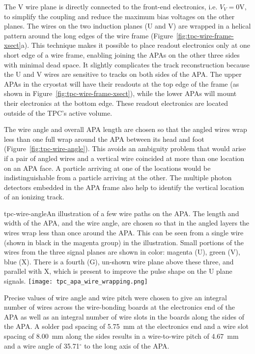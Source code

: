 The V wire plane is directly connected to the front-end electronics, i.e. $V_V=0$V, to simplify the coupling and 
reduce the maximum bias voltages on the other planes. The wires on the two induction planes (U and V) are wrapped in a helical pattern around the long edges of the wire frame 
(Figure~\ref{fig:tpc-wire-frame-xsect}a). This technique makes it possible to place readout 
electronics only at one short edge of a wire frame, enabling joining the APAs on the other three sides with minimal dead space.  It slightly complicates 
the track reconstruction because the U and V wires are sensitive to tracks on 
both sides of the APA.  The upper APAs in the cryostat will have their readouts
at the top edge of the frame (as shown in Figure~\ref{fig:tpc-wire-frame-xsect}), 
while the lower APAs will mount their electronics at the bottom edge.  These readout electronics are located outside of the TPC's active volume.

The wire angle and overall APA length are chosen so that the angled wires wrap less than one full wrap around the APA between its head and foot (Figure~\ref{fig:tpc-wire-angle}).  This avoids an ambiguity problem that would arise if a pair of angled wires and a vertical wire coincided at more than one location on an APA face.  A particle arriving at one of the locations would be indistinguishable from a particle arriving at the other.  The multiple photon detectors embedded in the APA frame also help to identify the vertical location of an ionizing track.

\begin{cdrfigure}{tpc-wire-angle}{An illustration of a few wire paths on the APA.  The length and width of the APA, and the wire angle, are chosen so that in the angled layers the wires wrap less than once around the APA.  This can be seen from a single wire (shown in black in the magenta group) in the illustration.  Small portions of the wires from the three signal planes are shown in color: magenta (U), green (V), blue (X).  There is a fourth (G), un-shown wire plane above these three, and parallel with X, which is present to improve the pulse shape on the U plane signals.}
\texttt{[image: tpc\_apa\_wire\_wrapping.png]}
\end{cdrfigure}


Precise values of wire angle and wire pitch were chosen to give an integral number of wires across the wire-bonding boards at the electronics end of the APA as well as an integral number of wire slots in the boards along the sides of the APA.  A solder pad spacing of 5.75~mm at the electronics end and a wire slot spacing of 8.00~mm along the sides results in a wire-to-wire pitch of 4.67~mm and a wire angle of 35.71$^\circ$ to the long axis of the APA.


